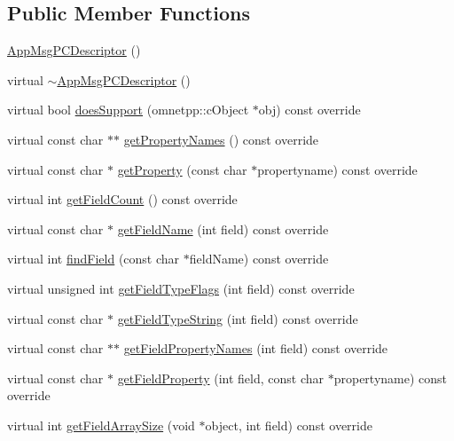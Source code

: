 \subsection*{Public Member Functions}
\begin{DoxyCompactItemize}
\item 
\hyperlink{classAppMsgPCDescriptor_a3a331f63d98d56b7433d83ad6afd2fa1}{App\+Msg\+P\+C\+Descriptor} ()
\item 
virtual \hyperlink{classAppMsgPCDescriptor_a7928920541dd96935380cd468ee51d5a}{$\sim$\+App\+Msg\+P\+C\+Descriptor} ()
\item 
virtual bool \hyperlink{classAppMsgPCDescriptor_a198ed191c1c36b7b177779ab6c36be01}{does\+Support} (omnetpp\+::c\+Object $\ast$obj) const override
\item 
virtual const char $\ast$$\ast$ \hyperlink{classAppMsgPCDescriptor_a4e178c3b5f9cca9e86b4e858d3964de7}{get\+Property\+Names} () const override
\item 
virtual const char $\ast$ \hyperlink{classAppMsgPCDescriptor_aa3e2e1730d4446da261f56a6c62b8703}{get\+Property} (const char $\ast$propertyname) const override
\item 
virtual int \hyperlink{classAppMsgPCDescriptor_a2936e9fbdd28e56c2197380ada446d5e}{get\+Field\+Count} () const override
\item 
virtual const char $\ast$ \hyperlink{classAppMsgPCDescriptor_aa147246f0555048fc684ce8bdbf4964f}{get\+Field\+Name} (int field) const override
\item 
virtual int \hyperlink{classAppMsgPCDescriptor_a23a276307871f95930bf7f03df3fb178}{find\+Field} (const char $\ast$field\+Name) const override
\item 
virtual unsigned int \hyperlink{classAppMsgPCDescriptor_ab112abe6a70f75081cd176586e9ac6d4}{get\+Field\+Type\+Flags} (int field) const override
\item 
virtual const char $\ast$ \hyperlink{classAppMsgPCDescriptor_aa5a22389b1a0d2b8e97c936f69a2ed39}{get\+Field\+Type\+String} (int field) const override
\item 
virtual const char $\ast$$\ast$ \hyperlink{classAppMsgPCDescriptor_a36f69eac7b710983aa66c647ca0a15c8}{get\+Field\+Property\+Names} (int field) const override
\item 
virtual const char $\ast$ \hyperlink{classAppMsgPCDescriptor_a1c141ad9ba88b4113c35424827a46ee9}{get\+Field\+Property} (int field, const char $\ast$propertyname) const override
\item 
virtual int \hyperlink{classAppMsgPCDescriptor_abd0b0ccd2b54ad45825704c566922f67}{get\+Field\+Array\+Size} (void $\ast$object, int field) const override

\end{DoxyCompactItemize}
